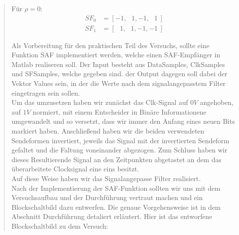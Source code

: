\begin{quote}
    Für $\rho = 0$: 
    \begin{equation*}
        \begin{split}
            SF_0 &= [-1, \ \ \ 1, -1, \ \ \ 1 \ ]\\
            SF_1 &= [ \ \ \ 1, \ \ \ 1, -1, -1 \ ]
        \end{split}
    \end{equation*}
    
    
    Als Vorbereitung für den praktischen Teil des Versuchs, sollte eine Funktion
    SAF implementiert werden, welche einen SAF-Empfänger in Matlab realiseren soll.
    Der Input besteht aus DataSamples, ClkSamples und SFSamples, welche gegeben
    sind. der Output dagegen soll dabei der Vektor Values sein, in der die Werte
    nach dem signalangepasstem Filter eingetragen sein sollen.\\
	
	
	Um das umzusetzen haben wir zunächst das Clk-Signal auf $0V$ angehoben, auf $1V$ normiert, mit einem Entscheider in
	Binäre Informationene umgewandelt und so versetzt, dass wir immer den Anfang eines neuen Bits markiert haben.
	Anschließend haben wir die beiden verwendeten Sendeformen invertiert, jeweils das Signal mit der invertierten Sendeform
	gefaltet und die Faltung voneinander abgezogen. Zum Schluss haben wir dieses Resultierende Signal an den Zeitpunkten
	abgetastet an dem das überarbeitete Clocksignal eine eins besitzt.\\
	Auf diese Weise haben wir das Signalangepasse Filter realisiert.\\
	   

    Nach der Implementierung der SAF-Funktion sollten wir uns mit dem
    Versuchsaufbau und der Durchführung vertraut machen und  ein Blockschaltbild
    dazu entwerfen. Die genaue Vorgehensweise ist in dem Abschnitt Durchführung
    detaliert erläutert. Hier ist das entworfene Blockschaltbild zu dem Versuch:\\
    

\end{quote}
